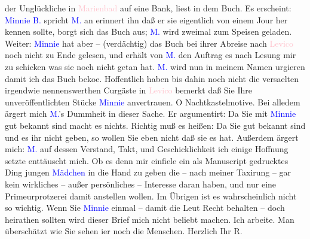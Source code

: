                der Unglückliche in \textcolor{pink}{Marienbad}{}\ledrightnote{\textcolor{pink}{Marienbad}} auf {\pb}eine Bank, liest \introOben{}in\introOben{} dem Buch. Es erscheint: \textcolor{blue}{Minnie B.}{}\ledrightnote{\textcolor{blue}{Hermine von Schaffgotsch}}
               spricht \textcolor{blue}{M.}{}\ledrightnote{\textcolor{blue}{Oskar Mayer}} an erinnert ihn daß er  sie eigentlich von einem Jour her kennen sollte,
               borgt sich das Buch aus; \textcolor{blue}{M.}{}\ledrightnote{\textcolor{blue}{Oskar Mayer}} wird zweimal zum
               Speisen geladen. Weiter: \textcolor{blue}{Minnie}{}\ledrightnote{\textcolor{blue}{Hermine von Schaffgotsch}} hat aber –
               (verdächtig) das Buch bei ihrer Abreise nach \textcolor{pink}{Levico}{}\ledrightnote{\textcolor{pink}{Levico Terme}} noch nicht zu Ende gelesen, und erhält von \textcolor{blue}{M.}{}\ledrightnote{\textcolor{blue}{Oskar Mayer}} den Auftrag es nach Lesung mir zu schicken was sie noch
               nicht getan hat. \textcolor{blue}{M.}{}\ledrightnote{\textcolor{blue}{Oskar Mayer}} wird nun in meinem Namen
               urgieren damit ich das Buch  beko{\geminationm}e. Hoffentlich
               haben bis dahin noch nicht die versa{\geminationm}elten irgendwie
               nennenswerthen Curgäste in \textcolor{pink}{Levico}{}\ledrightnote{\textcolor{pink}{Levico Terme}} bemerkt daß Sie
               Ihre unveröffentlichten Stücke \textcolor{blue}{Minnie}{}\ledrightnote{\textcolor{blue}{Hermine von Schaffgotsch}}
               anvertrauen. O Nachtkastelmotive. Bei alledem ärgert mich \textcolor{blue}{M.}{}\ledrightnote{\textcolor{blue}{Oskar Mayer}}’s Dummheit in dieser Sache. Er argumentirt: Da Sie mit \textcolor{blue}{Minnie}{}\ledrightnote{\textcolor{blue}{Hermine von Schaffgotsch}} gut {\pb}bekannt sind macht es nichts.
               Richtig muß es heißen: Da Sie gut bekannt sind und es ihr nicht geben, so wollen Sie
               eben nicht daß sie es hat. Außerdem ärgert mich: \textcolor{blue}{M.}{}\ledrightnote{\textcolor{blue}{Oskar Mayer}} auf dessen Verstand, Takt, und Geschicklichkeit ich einige Hoffnung
               setzte enttäuscht mich. Ob es denn mir einfiele ein als Manuscript gedrucktes Ding
               jungen \textcolor{blue}{Mädchen}{} in die Hand zu
               geben die – nach meiner Taxirung – gar kein wirkliches – außer persönliches –
               Interesse daran haben, und nur eine Primeurprotzerei damit anstellen wollen. Im
               Übrigen ist es wahrscheinlich nicht so wichtig.\pend
           \pstart
           Wenn Sie \textcolor{blue}{Minnie}{}\ledrightnote{\textcolor{blue}{Hermine von Schaffgotsch}} einmal – damit die Leut Recht
               behalten – doch heirathen sollten wird dieser Brief mich nicht beliebt machen.\pend
           \pstart
           Ich arbeite. Man überschätzt wie Sie sehen i{\geminationm}er noch die
               Menschen. Herzlich Ihr \spacefill\mbox{R.}\pend
           \endnumbering{}  
      